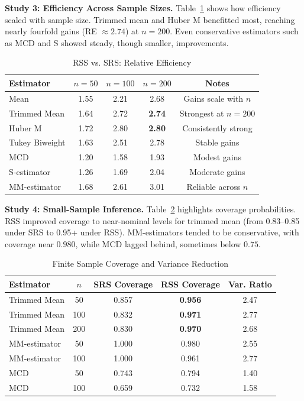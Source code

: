 \documentclass[12pt]{article}
\begin{document}
\textbf{Study 3: Efficiency Across Sample Sizes.}
Table~\ref{tab:rss_performance} shows how efficiency scaled with sample size. Trimmed mean and Huber M benefitted most, reaching nearly fourfold gains (RE $\approx 2.74$) at $n=200$. Even conservative estimators such as MCD and S showed steady, though smaller, improvements.

\begin{table}[htbp]
\centering
\caption{RSS vs. SRS: Relative Efficiency}
\label{tab:rss_performance}
\begin{tabular}{lcccc}
\toprule
Estimator & $n=50$ & $n=100$ & $n=200$ & Notes \\
\midrule
Mean & 1.55 & 2.21 & 2.68 & Gains scale with $n$ \\
Trimmed Mean & 1.64 & 2.72 & \textbf{2.74} & Strongest at $n=200$ \\
Huber M & 1.72 & 2.80 & \textbf{2.80} & Consistently strong \\
Tukey Biweight & 1.63 & 2.51 & 2.78 & Stable gains \\
MCD & 1.20 & 1.58 & 1.93 & Modest gains \\
S-estimator & 1.26 & 1.69 & 2.04 & Moderate gains \\
MM-estimator & 1.68 & 2.61 & 3.01 & Reliable across $n$ \\
\bottomrule
\end{tabular}
\end{table}

\textbf{Study 4: Small-Sample Inference.}
Table~\ref{tab:finite_sample} highlights coverage probabilities. RSS improved coverage to near-nominal levels for trimmed mean (from 0.83--0.85 under SRS to 0.95+ under RSS). MM-estimators tended to be conservative, with coverage near
$0.980$, while MCD lagged behind, sometimes below $0.75$.

\begin{table}[htbp]
\centering
\caption{Finite Sample Coverage and Variance Reduction}
\label{tab:finite_sample}
\begin{tabular}{lcccc}
\toprule
Estimator & $n$ & SRS Coverage & RSS Coverage & Var. Ratio \\
\midrule
Trimmed Mean & 50 & 0.857 & \textbf{0.956} & 2.47 \\
Trimmed Mean & 100 & 0.832 & \textbf{0.971} & 2.77 \\
Trimmed Mean & 200 & 0.830 & \textbf{0.970} & 2.68 \\
MM-estimator & 50 & 1.000 & 0.980 & 2.55 \\
MM-estimator & 100 & 1.000 & 0.961 & 2.77 \\
MCD & 50 & 0.743 & 0.794 & 1.40 \\
MCD & 100 & 0.659 & 0.732 & 1.58 \\
\bottomrule
\end{tabular}
\end{table}
\end{document}
